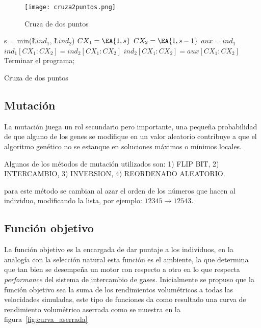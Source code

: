 \begin{figure}
  \centering
  \texttt{[image: cruza2puntos.png]}
  \caption{Cruza de dos puntos}\label{fig:cr2puntos}
\end{figure}


\begin{algorithm}[]
  \BlankLine
  s = min(\L{$ind_{1}$}, \L {$ind_{2}$})\;
  $CX_{1} = \EA{1, s}$\;
  $CX_{2} = \EA{1, s-1}$\;
  $aux = ind_{1}$\;
  $ind_{1}[CX_{1}:CX_{2}] = ind_{2}[CX_{1}:CX_{2}]$\;
  $ind_{2}[CX_{1}:CX_{2}] = aux[CX_{1}:CX_{2}]$\;
  \;
  Terminar el programa;
  \caption{Cruza de dos puntos}\label{algo:cr2puntos}
\end{algorithm}

\subsection{Mutación}
%
La mutación juega un rol secundario pero importante, una pequeña probabilidad
de que alguno de los genes se modifique en un valor aleatorio contribuye a que
el algoritmo genético no se estanque en soluciones máximos o mínimos locales.

Algunos de los métodos de mutación utilizados son: 1) FLIP BIT, 2) INTERCAMBIO,
3) INVERSION, 4) REORDENADO ALEATORIO.


para este método se cambian al azar el orden de los números que hacen al
individuo, modificando la lista, por ejemplo: $12345 \rightarrow 12543$.

\subsection{Función objetivo}\label{sec:funcion_objetivo}
%
La función objetivo es la encargada de dar puntaje a los individuos, en la
analogía con la selección natural esta función es el ambiente, la que determina
que tan bien se desempeña un motor con respecto a otro en lo que respecta
\emph{performance} del sistema de intercambio de gases.
%
Inicialmente se propuso que la función objetivo sea la suma de los rendimientos
volumétricos a todas las velocidades simuladas, este tipo de funciones da como
resultado una curva de rendimiento volumétrico aserrada como se muestra en la
figura~\ref{fig:curva_aserrada}

